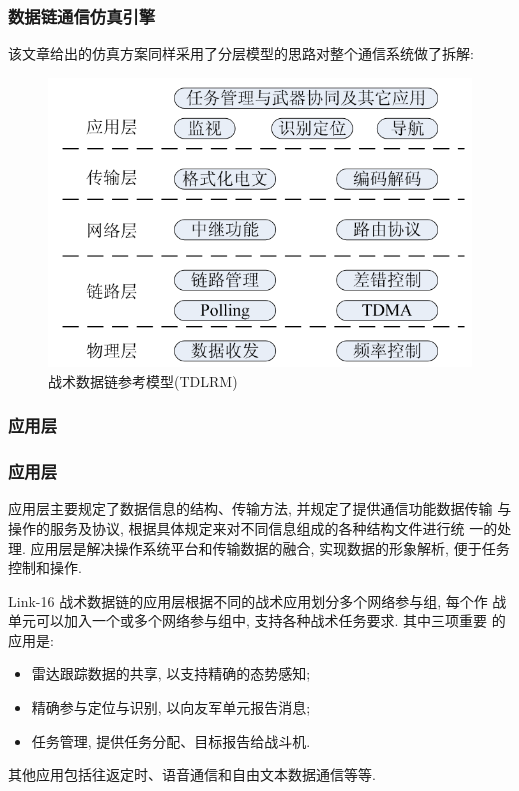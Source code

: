 \documentclass[10pt,mathserif]{beamer}%
\begin{document}
\begin{frame}[fragile]
	\frametitle{数据链通信仿真引擎}
	\setlength{\parindent}{2em}
	\begin{spacing}{1.5}
		该文章给出的仿真方案同样采用了分层模型的思路对整个通信系统做了拆解:
		\begin{figure}[htb]
			\centering
			\includegraphics[width=0.8\linewidth]{./images/layer.png}
			\caption{战术数据链参考模型(TDLRM)}
			\label{Fig:layer}
		\end{figure}
	\end{spacing}
\end{frame}

\subsubsection{应用层}

\begin{frame}[fragile]
	\frametitle{应用层}
	\setlength{\parindent}{2em}
	\begin{spacing}{1.2}
		应用层主要规定了数据信息的结构、传输方法, 并规定了提供通信功能数据传输
		与操作的服务及协议, 根据具体规定来对不同信息组成的各种结构文件进行统
		一的处理. 应用层是解决操作系统平台和传输数据的融合, 实现数据的形象解析,
		便于任务控制和操作. 

		Link-16 战术数据链的应用层根据不同的战术应用划分多个网络参与组, 每个作
		战单元可以加入一个或多个网络参与组中, 支持各种战术任务要求. 其中三项重要
		的应用是:
		\begin{itemize}
			\item 雷达跟踪数据的共享, 以支持精确的态势感知;
			\item 精确参与定位与识别, 以向友军单元报告消息;
			\item 任务管理, 提供任务分配、目标报告给战斗机.
		\end{itemize}
		
		其他应用包括往返定时、语音通信和自由文本数据通信等等.
	\end{spacing}
\end{frame}
\end{document}
